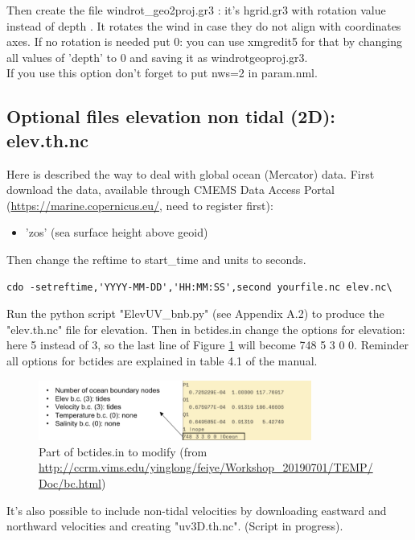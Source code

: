 \documentclass[preprints,briefreport,accept,oneauthor,pdftex]{Definitions/mdpi}
\begin{document}
Then create the file windrot\_geo2proj.gr3 : it's hgrid.gr3 with rotation value instead of depth . It rotates the wind in case they do not align with coordinates axes. If no rotation is needed put 0: you can use xmgredit5 for that by changing all values of 'depth' to 0 and saving it as windrotgeoproj.gr3.\\
If you use this option don't forget to put nws=2 in param.nml.

\subsection{Optional files elevation non tidal (2D): elev.th.nc}
\noindent Here is described the way to deal with global ocean (Mercator) data. First download the data, available through CMEMS Data Access Portal (\url{https://marine.copernicus.eu/}, need to register first):
\begin{itemize}
    \item 'zos' (sea surface height above geoid)
\end{itemize}
Then change the reftime  to start\_time and units to seconds.
\begin{lstlisting}
cdo -setreftime,'YYYY-MM-DD','HH:MM:SS',second yourfile.nc elev.nc\
\end{lstlisting}
Run the python script "ElevUV\_bnb.py" (see Appendix A.2) to produce the "elev.th.nc" file for elevation. Then in bctides.in change the options for elevation: here 5 instead of 3, so the last line of Figure \ref{fig:caseBC} will become 748 5 3 0 0. Reminder all options for bctides are explained in table 4.1 of the manual.\\
\begin{figure}[htbp]
    \centering
    \includegraphics[width=0.8\textwidth]{figures/elevbc.png}
    \caption{Part of bctides.in to modify (from \url{http://ccrm.vims.edu/yinglong/feiye/Workshop_20190701/TEMP/Doc/bc.html})}
    \label{fig:caseBC}
\end{figure}
It's also possible to include non-tidal velocities by downloading eastward and northward velocities and creating "uv3D.th.nc". (Script in progress).
\end{document}
